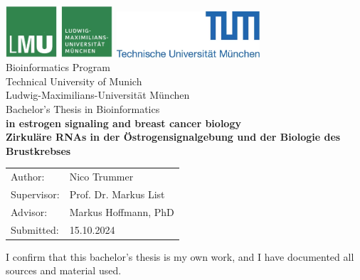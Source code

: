 \documentclass[pdftex,12pt,a4paper]{report}
\begin{document}
\begin{titlepage}

    \begin{center}
        \includegraphics[width=0.3\textwidth]{logos/lmu.png}
        \hfill
        \includegraphics[width=0.4\textwidth]{logos/tum.png}
        \\[3cm]

        {\Large Bioinformatics Program}\\[0.5cm]
        {\Large Technical University of Munich}\\[0.5cm]
        {\Large Ludwig-Maximilians-Universität München}\\[2cm]
        {\Large Bachelor's Thesis in Bioinformatics}\\[2cm]
        {\textbf{\LARGE {} in estrogen signaling and
            breast cancer
            biology}}\\[2cm]
        {\textbf{\LARGE Zirkuläre RNAs in der Östrogensignalgebung und
            der
            Biologie des
            Brustkrebses}}\\[3cm]

    \end{center}

    \begin{center}\Large
        \begin{tabular}{ll}
            Author:    & Nico Trummer \\ Supervisor: & Prof.
               Dr.
            Markus List               \\ Advisor: & Markus Hoffmann, PhD		   \\
            Submitted: & 15.10.2024\end{tabular} \end{center} 

\end{titlepage} 

\noindent I confirm that this bachelor's thesis is my own work, and I have
documented all sources and material used.
\end{document}
